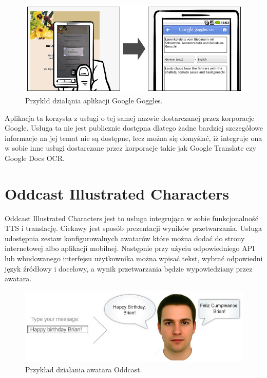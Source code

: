 \begin{figure}[!h]
	\centering
	\includegraphics[scale=0.5]{google_goggles.png}
	\caption{Przykłd działąnia aplikacji Google Goggles\cite{googlegoggles}. }\label{fig:google_goggles}
\end{figure}

Aplikacja ta korzysta z usługi o tej samej nazwie dostarczanej przez korporacje Google. Usługa ta nie jest publicznie dostępna dlatego żadne bardziej szczegółowe informacje na jej temat nie są dostępne, lecz można się domyślać, iż integruje ona w sobie inne usługi dostarczane przez korporacje takie jak Google Translate czy Google Docs OCR. 

\section {Oddcast Illustrated Characters}

Oddcast Illustrated Characters\cite{oddcasts} jest to usługa integrująca w sobie funkcjonalność TTS i translację. Ciekawy jest sposób prezentacji wyników przetwarzania. Usługa udostępnia zestaw konfigurowalnych awatarów które można dodać do strony internetowej albo aplikacji mobilnej. Następnie przy użyciu odpowiedniego API lub wbudowanego interfejsu użytkownika można wpisać tekst, wybrać odpowiedni język źródłowy i docelowy, a wynik przetwarzania będzie wypowiedziany przez awatara.

\begin{figure}[!h]
	\centering
	\includegraphics[scale=0.60]{oddcast.png}
	\caption{Przykład działania awatara Oddcast\cite{oddcasts}. }\label{fig:oddcast}
\end{figure}

